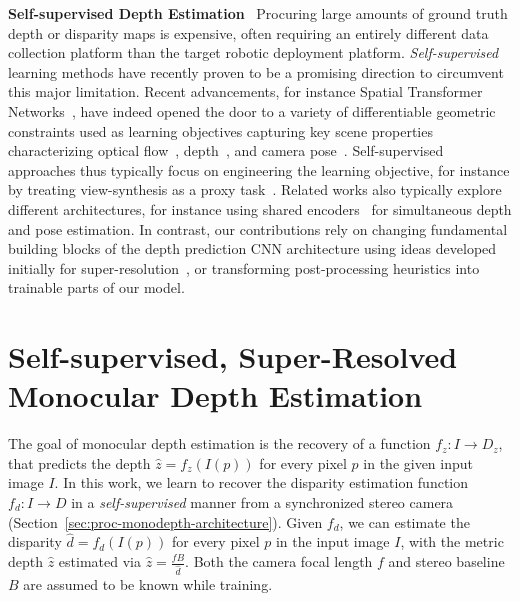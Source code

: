 \documentclass[letterpaper, 10 pt, conference]{ieeeconf}  \IEEEoverridecommandlockouts
\begin{document}
\textbf{Self-supervised Depth Estimation}~
Procuring large amounts of ground truth depth or disparity maps is expensive, often requiring an entirely different data collection platform than the target robotic deployment platform.
\textit{Self-supervised} learning methods have recently proven to be a promising direction to circumvent this major limitation.
Recent advancements, for instance Spatial Transformer Networks~\cite{jaderberg2015spatial}, have indeed opened the door to a variety of differentiable geometric constraints used as learning objectives capturing key scene properties characterizing optical flow~\cite{yin2018geonet,meister2017unflow}, depth~\cite{godard2017unsupervised,garg2016unsupervised,li2017undeepvo,mahjourian2018unsupervised}, and camera pose~\cite{zhou2017unsupervised,li2017undeepvo}.
Self-supervised approaches thus typically focus on engineering the learning objective, for instance by treating view-synthesis as a proxy task~\cite{zhou2016view,flynn2016deepstereo,godard2017unsupervised,godard2018digging,li2017undeepvo,fei2018geo}.
Related works also typically explore different architectures, for instance using shared encoders~\cite{godard2018digging} for simultaneous depth and pose estimation.
In contrast, our contributions rely on changing fundamental building blocks of the depth prediction CNN architecture using ideas developed initially for super-resolution~\cite{shi2016real}, or transforming post-processing heuristics into trainable parts of our model.









%
 \newpage
\section{Self-supervised, Super-Resolved Monocular Depth Estimation}
\label{sec:procedure}

The goal of monocular depth estimation is the recovery of a function $f_z: I \to D_z$, that predicts the depth $\hat{z} = f_z(I(p))$ for every pixel $p$ in the given input image $I$. In this work, we learn to recover the disparity estimation function $f_d: I \to D$ in a \textit{self-supervised} manner from a synchronized stereo camera (Section~\ref{sec:proc-monodepth-architecture}). Given $f_d$, we can  estimate the disparity $\hat{d} = f_d(I(p))$ for every pixel $p$ in the input image $I$, with the metric depth $\hat{z}$ estimated via $\hat{z} = \frac{fB}{\hat{d}}$. Both the camera focal length $f$ and stereo baseline $B$ are assumed to be known while training. 
\end{document}
